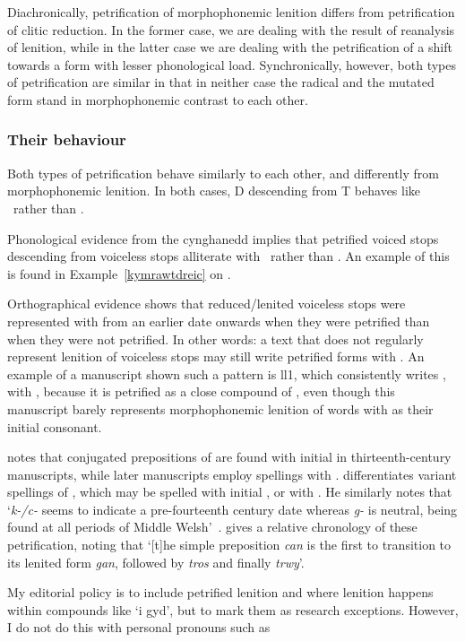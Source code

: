 Diachronically, petrification of morphophonemic lenition differs from petrification of clitic reduction. 
In the former case, we are dealing with the result of reanalysis of lenition, while in the latter case we are dealing with the petrification of a shift towards a form with lesser phonological load. 
Synchronically, however, both types of petrification are similar in that in neither case the radical and the mutated form stand in morphophonemic contrast to each other. 

\subsubsection{Their behaviour}
\label{sec:their-behaviour}
Both types of petrification behave similarly to each other, and differently from morphophonemic lenition. 
In both cases, \gls{D} descending from \gls{T} behaves like \xD\ rather than \lT.

Phonological evidence from the cynghanedd implies that petrified voiced stops descending from voiceless stops alliterate with \xD\ rather than \lT. An example of this is found in Example~\ref{kymrawtdreic} on . 

Orthographical evidence shows that reduced/lenited voiceless stops were represented with  from an earlier date onwards when they were petrified than when they were not petrified. 
In other words: a text that does not regularly represent lenition of voiceless stops may still write petrified forms with . 
An example of a manuscript shown such a pattern is \gls{ll1}, which consistently writes , with , because it is petrified as a close compound of , even though this manuscript barely represents morphophonemic lenition of words with  as their initial consonant.

\Textcite[52]{jongeleen_lenition_2016} notes that conjugated prepositions of  are found with initial   in thirteenth-century manuscripts, while later manuscripts employ spellings with .
\Textcite{sims-williams_variation_2013} differentiates variant spellings of , which may be spelled with initial , or with .
He similarly notes that `\textit{k-/c-} seems to indicate a pre-fourteenth century date whereas \textit{g-} is neutral, being found at all periods of Middle Welsh'~\autocite[24]{sims-williams_variation_2013}. \Textcite[55]{jongeleen_lenition_2016} gives a relative chronology of these petrification, noting that `[t]he simple preposition \textit{can} is the first to transition to its lenited form \textit{gan}, followed by \textit{tros} and finally \textit{trwy}'.

My editorial policy is to include petrified lenition and where lenition happens within compounds like `i gyd', but to mark them as research exceptions. However, I do not do this with personal pronouns such as 



